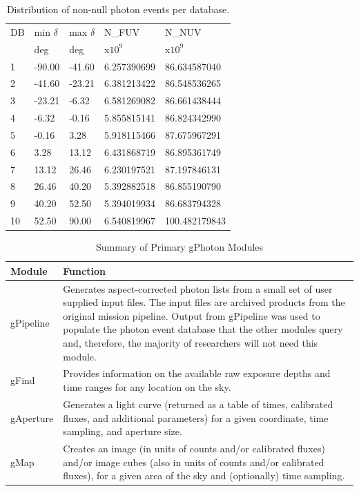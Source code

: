 \documentclass[preprint]{aastex}
\begin{document}
\begin{table}
\begin{tabularx}{.47\textwidth}{lllll}
\hline\hline
DB & min $\delta$ & max $\delta$ & N\_FUV & N\_NUV\\
   & deg          & deg          & x$10^9$ & x$10^9$\\
\hline
1 & -90.00 & -41.60 &   6.257390699 &  86.634587040\\
2 & -41.60 & -23.21 &   6.381213422 &  86.548536265\\
3 & -23.21 &  -6.32 &   6.581269082 &  86.661438444\\
4 &  -6.32 &  -0.16 &   5.855815141 &  86.824342990\\
5 &  -0.16 &   3.28 &   5.918115466 &  87.675967291\\
6 &   3.28 &  13.12 &   6.431868719 &  86.895361749\\
7 &  13.12 &  26.46 &   6.230197521 &  87.197846131\\
8 &  26.46 &  40.20 &   5.392882518 &  86.855190790\\
9 &  40.20 &  52.50 &   5.394019934 &  86.683794328\\
10 &  52.50 &  90.00 &   6.540819967 & 100.482179843\\
\hline
\end{tabularx}
\caption{Distribution of non-null photon events per database.\label{dbcounts}}
\end{table}


\begin{table}
\begin{tabular}{|p{2cm}|p{6cm}|}
\hline
	{\bf Module} & {\bf Function}\\\hline
	gPipeline & Generates aspect-corrected photon lists from a small set of user supplied input files. The input files are archived products from the original mission pipeline. Output from gPipeline was used to populate the photon event database that the other modules query and, therefore, the majority of researchers will not need this module.\\\hline
	gFind & Provides information on the available raw exposure depths and time ranges for any location on the sky.\\\hline
	gAperture & Generates a light curve (returned as a table of times, calibrated fluxes, and additional parameters) for a given coordinate, time sampling, and aperture size.\\\hline
	gMap & Creates an image (in units of counts and/or calibrated fluxes) and/or image cubes (also in units of counts and/or calibrated fluxes), for a given area of the sky and (optionally) time sampling.\\
\hline
\end{tabular}
\caption{Summary of Primary gPhoton Modules}
\label{moduledesc}
\end{table}
\end{document}
